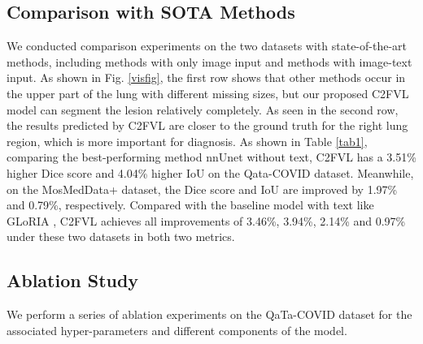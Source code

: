 \documentclass{article}
\begin{document}
\subsection{Comparison with SOTA Methods}
\vspace{-2mm}
We conducted comparison experiments on the two datasets with state-of-the-art methods, including methods with only image input and methods with image-text input. As shown in Fig. \ref{visfig}, the first row shows that other methods occur in the upper part of the lung with different missing sizes, but our proposed C2FVL model can segment the lesion relatively completely. As seen in the second row, the results predicted by C2FVL are closer to the ground truth for the right lung region, which is more important for diagnosis.
As shown in Table \ref{tab1}, comparing the best-performing method nnUnet without text, C2FVL has a 3.51\% higher Dice score and 4.04\% higher IoU on the Qata-COVID dataset. Meanwhile, on the MosMedData+ dataset, the Dice score and IoU are improved by 1.97\% and 0.79\%, respectively. Compared with the baseline model with text like GLoRIA \cite{huang2021gloria}, C2FVL achieves all improvements of 3.46\%, 3.94\%, 2.14\% and 0.97\% under these two datasets in both two metrics.


\vspace{-4mm}
\subsection{Ablation Study}
\vspace{-2mm}
We perform a series of ablation experiments on the QaTa-COVID dataset for the associated hyper-parameters and different components of the model.
\end{document}
